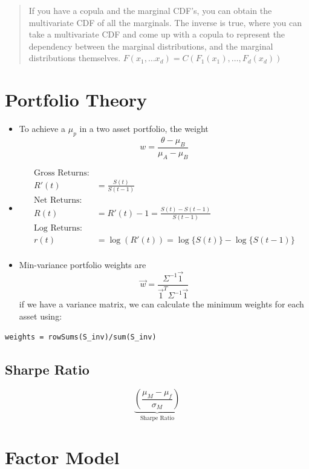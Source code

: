 \documentclass[
  oneside]{book}
\providecommand{\tightlist}{%
  \setlength{\itemsep}{0pt}\setlength{\parskip}{0pt}}
\begin{document}
\begin{quote}
If you have a copula and the marginal CDF's, you can obtain the multivariate CDF of all the marginals. The inverse is true, where you can take a multivariate CDF and come up with a copula to represent the dependency between the marginal distributions, and the marginal distributions themselves.
\(F(x_{1},\dots x_{d}) = C(F_{1}(x_{1}), \dots, F_{d}(x_{d}))\)
\end{quote}

\hypertarget{portfolio-theory-1}{%
\section{Portfolio Theory}\label{portfolio-theory-1}}

\begin{itemize}
\tightlist
\item
  To achieve a \(\mu_{p}\) in a two asset portfolio, the weight \[w = \frac{\theta -\mu_{B}}{\mu_{A}-\mu_{B}}\]
\item
  \[
  \begin{aligned}
  \text{Gross Returns:}&\\
  R'(t) &= \frac{S(t)}{S(t-1)}\\
  \text{Net Returns:}&\\
  R(t) &= R'(t)-1 = \frac{S(t)-S(t-1)}{S(t-1)}\\
  \text{Log Returns:}&\\
  r(t) &= \log(R'(t)) = \log\{S(t)\}-\log\{S(t-1)\}\\
  \end{aligned}
  \]
\item
  Min-variance portfolio weights are \[\vec{w} = \frac{\Sigma^{-1} \vec{1}}{\vec{1}^{T}\Sigma ^{-1} \vec{1}}\]
  if we have a variance matrix, we can calculate the minimum weights for each asset using:
\end{itemize}

\begin{verbatim}
weights = rowSums(S_inv)/sum(S_inv)
\end{verbatim}

\hypertarget{sharpe-ratio}{%
\subsection{Sharpe Ratio}\label{sharpe-ratio}}

\[
\underbrace{ \left(\frac{\mu_{M}-\mu_{f}}{\sigma_{M}}  \right)}_{ \text{Sharpe Ratio} }
\]

\hypertarget{factor-model}{%
\section{Factor Model}\label{factor-model}}
\end{document}

